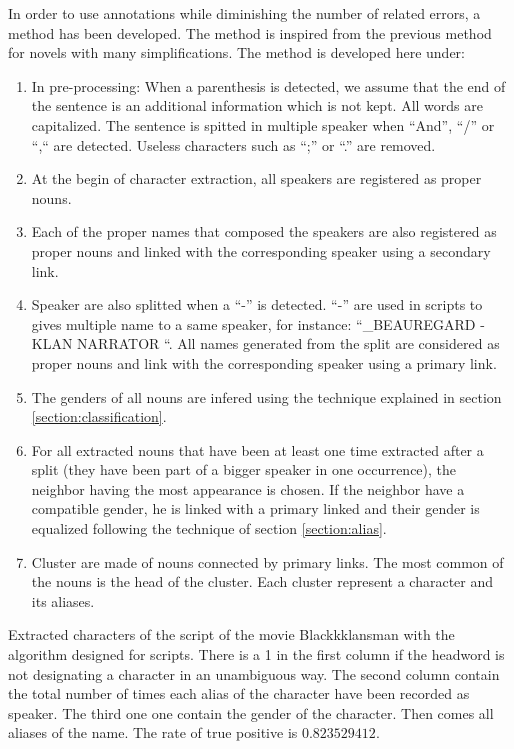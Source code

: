 \documentclass[a4paper, 12pt]{report}
\begin{document}
In order to use annotations while diminishing the number of related errors, a method has been developed. The method is inspired from the previous method for novels with many simplifications. The method is developed here under:
\begin{enumerate}
\item In pre-processing: When a parenthesis is detected, we assume that the end of the sentence is an additional information which is not kept. All words are capitalized. The sentence is spitted in multiple speaker when ``And'', ``/''  or ``,`` are detected.   Useless characters such as ``;'' or ``.'' are removed.
\item At the begin of character extraction, all speakers are registered as proper nouns.
\item Each of the proper names that composed the speakers are also registered as proper nouns and linked with the corresponding speaker using a secondary link.
\item Speaker are also splitted when a ``-'' is detected. ``-'' are used in scripts to gives multiple name to a same speaker, for instance: ``_BEAUREGARD - KLAN NARRATOR ``. All names generated from the split are considered as proper nouns and link with the corresponding speaker using a primary link.
\item The genders of all nouns are infered using the technique explained in section \ref{section:classification}.
\item For all extracted nouns that have been at least one time extracted after a split (they have been part of a bigger speaker in one occurrence), the  neighbor having the most appearance is chosen. If the neighbor have a compatible gender, he is linked with a primary linked and their gender is equalized following the technique of section \ref{section:alias}.
\item Cluster are made of nouns connected by primary links. The most common of the nouns is the head of the cluster. Each cluster represent a character and its aliases.
\end{enumerate}


\begin{table}[]
\caption{Extracted characters of the script of the movie Blackkklansman with the algorithm designed for scripts. There is a 1 in the first column if the headword is not designating a character in an unambiguous way. The second column contain the total number of times each alias of the character have been recorded as speaker. The third one one contain the gender of the character. Then comes all aliases of the name. The rate of true positive is $0.823529412$.}
 \label{character_bkm}
\end{table}
\end{document}
